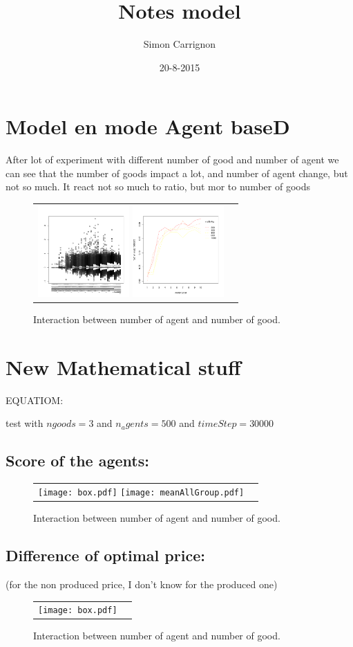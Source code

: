 \documentclass[a4paper]{article}
\title{Notes model}
\author{Simon Carrignon}
\date{20-8-2015}
\begin{document}
\section{Model en mode Agent baseD}
After lot of experiment with different number of good and number of agent we can see that the number of goods impact a lot, and number of agent change, but not so much. It react not so much to ratio, but mor to number of goods

\begin{figure}[htp]
    \centering
    \begin{tabular}{cc}
	\includegraphics[width=3.5cm]{interactionNGoodNAgent.pdf}
	\includegraphics[width=3.5cm]{interactionNGoodNAgentSD.pdf}
    \end{tabular}
    \caption{Interaction between number of agent and number of good.}
\end{figure}

\section{New Mathematical stuff}

EQUATIOM: %

test with $ngoods=3$ and $n_agents=500$ and $timeStep=30000$

\subsection{Score of the agents:}
\begin{figure}[htp]
    \centering
    \begin{tabular}{cc}
	\texttt{[image: box.pdf]}
	\texttt{[image: meanAllGroup.pdf]}
    \end{tabular}
    \caption{Interaction between number of agent and number of good.}
\end{figure}
\subsection{Difference of optimal price:}
(for the non produced price, I don't know for the produced one)
\begin{figure}[htp]
    \centering
    \begin{tabular}{cc}
	\texttt{[image: box.pdf]}
    \end{tabular}
    \caption{Interaction between number of agent and number of good.}
\end{figure}
\end{document}
